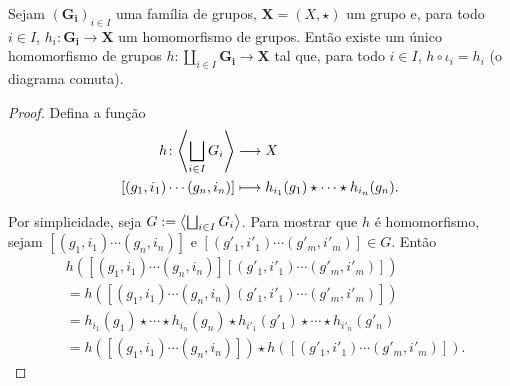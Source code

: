 \begin{proposition}
Sejam $(\bm{G_i})_{i \in I}$ uma família de grupos, $\bm X = (X,\star)$ um grupo e, para todo $i \in I$, $h_i: \bm{G_i} \to \bm X$ um homomorfismo de grupos. Então existe um único homomorfismo de grupos $h: \coprod_{i \in I} \bm{G_i} \to \bm X$ tal que, para todo $i \in I$, $h \circ \iota_i = h_i$ (o diagrama comuta).
\begin{figure}
\centering
{}
\end{figure}
\end{proposition}
\begin{proof}
Defina a função
	\begin{align*}
	{h}\colon {\left\langle \bigsqcup_{i \in I} G_i \right\rangle} &\longrightarrow {X} \\{\left[(g_1,i_1) \cdots (g_n,i_n)\right]} &\longmapsto h_{i_1}(g_1) \star \cdots \star h_{i_n}(g_n).
	\end{align*}

Por simplicidade, seja $G := \left\langle \bigsqcup_{i \in I} G_i \right\rangle$. Para mostrar que $h$ é homomorfismo, sejam $[(g_1,i_1) \cdots (g_n,i_n)]$ e $[(g'_1,i'_1) \cdots (g'_m,i'_m)] \in G$. Então
	\begin{align*}
	&h([(g_1,i_1) \cdots (g_n,i_n)][(g'_1,i'_1) \cdots (g'_m,i'_m)]) \\
		&= h([(g_1,i_1) \cdots (g_n,i_n)(g'_1,i'_1) \cdots (g'_m,i'_m)]) \\
		&= h_{i_1}(g_1) \star \cdots \star h_{i_n}(g_n) \star h_{i'_1}(g'_1) \star \cdots \star h_{i'_n}(g'_n) \\
		&= h([(g_1,i_1) \cdots (g_n,i_n)]) \star h([(g'_1,i'_1) \cdots (g'_m,i'_m)]).
	\end{align*}
\end{proof}








































